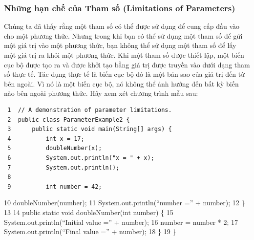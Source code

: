 \subsubsection{Những hạn chế của Tham số (Limitations of
Parameters)}\label{nhux1eefng-hux1ea1n-chux1ebf-cux1ee7a-tham-sux1ed1-limitations-of-parameters}

Chúng ta đã thấy rằng một tham số có thể được sử dụng để cung cấp đầu
vào cho một phương thức. Nhưng trong khi bạn có thể sử dụng một tham số
để gửi một giá trị vào một phương thức, bạn không thể sử dụng một tham
số để lấy một giá trị ra khỏi một phương thức. Khi một tham số được
thiết lập, một biến cục bộ được tạo ra và được khởi tạo bằng giá trị
được truyền vào dưới dạng tham số thực tế. Tác dụng thực tế là biến cục
bộ đó là một bản sao của giá trị đến từ bên ngoài. Vì nó là một biến cục
bộ, nó không thể ảnh hưởng đến bất kỳ biến nào bên ngoài phương thức.
Hãy xem xét chương trình mẫu sau:

\begin{verbatim}
 1  // A demonstration of parameter limitations.
 2  public class ParameterExample2 {
 3      public static void main(String[] args) {
 4          int x = 17;
 5          doubleNumber(x);
 6          System.out.println("x = " + x);
 7          System.out.println();
 8
 9          int number = 42;
\end{verbatim}

10 doubleNumber(number); 11 System.out.println(``number ='' + number);
12 \} 13 14 public static void doubleNumber(int number) \{ 15
System.out.println(``Initial value ='' + number); 16 number = number *
2; 17 System.out.println(``Final value ='' + number); 18 \} 19 \}

